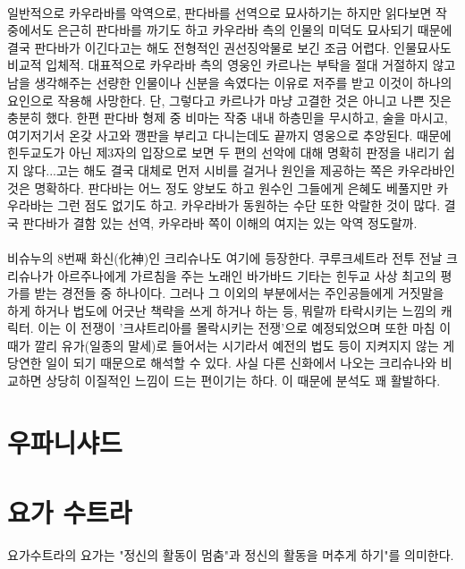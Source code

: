 \documentclass[12pt, a4paper, oneside]{book}
\let\stdsection\section
\renewcommand\section{\newpage\stdsection}
\begin{document}
\paragraph{}
일반적으로 카우라바를 악역으로, 판다바를 선역으로 묘사하기는 하지만 읽다보면 작중에서도 은근히 판다바를 까기도 하고 카우라바 측의 인물의 미덕도 묘사되기 때문에 결국 판다바가 이긴다고는 해도 전형적인 권선징악물로 보긴 조금 어렵다. 
인물묘사도 비교적 입체적. 대표적으로 카우라바 측의 영웅인 카르나는 부탁을 절대 거절하지 않고 남을 생각해주는 선량한 인물이나 신분을 속였다는 이유로 저주를 받고 이것이 하나의 요인으로 작용해 사망한다. 단, 그렇다고 카르나가 마냥 고결한 것은 아니고 나쁜 짓은 충분히 했다. 한편 판다바 형제 중 비마는 작중 내내 하층민을 무시하고, 술을 마시고, 여기저기서 온갖 사고와 깽판을 부리고 다니는데도 끝까지 영웅으로 추앙된다. 때문에 힌두교도가 아닌 제3자의 입장으로 보면 두 편의 선악에 대해 명확히 판정을 내리기 쉽지 않다...고는 해도 결국 대체로 먼저 시비를 걸거나 원인을 제공하는 쪽은 카우라바인 것은 명확하다. 판다바는 어느 정도 양보도 하고 원수인 그들에게 은혜도 베풀지만 카우라바는 그런 점도 없기도 하고. 카우라바가 동원하는 수단 또한 악랄한 것이 많다. 결국 판다바가 결함 있는 선역, 카우라바 쪽이 이해의 여지는 있는 악역 정도랄까.

\paragraph{}
비슈누의 8번째 화신(化神)인 크리슈나도 여기에 등장한다. 쿠루크셰트라 전투 전날 크리슈나가 아르주나에게 가르침을 주는 노래인 바가바드 기타는 힌두교 사상 최고의 평가를 받는 경전들 중 하나이다. 그러나 그 이외의 부분에서는 주인공들에게 거짓말을 하게 하거나 법도에 어긋난 책략을 쓰게 하거나 하는 등, 뭐랄까 타락시키는 느낌의 캐릭터. 이는 이 전쟁이 '크샤트리아를 몰락시키는 전쟁'으로 예정되었으며 또한 마침 이때가 깔리 유가(일종의 말세)로 들어서는 시기라서 예전의 법도 등이 지켜지지 않는 게 당연한 일이 되기 때문으로 해석할 수 있다. 
사실 다른 신화에서 나오는 크리슈나와 비교하면 상당히 이질적인 느낌이 드는 편이기는 하다. 이 때문에 분석도 꽤 활발하다.


\section{우파니샤드}

\section{요가 수트라}

요가수트라의 요가는 "정신의 활동이 멈춤"과 정신의 활동을 머추게 하기"를 의미한다.
\end{document}
